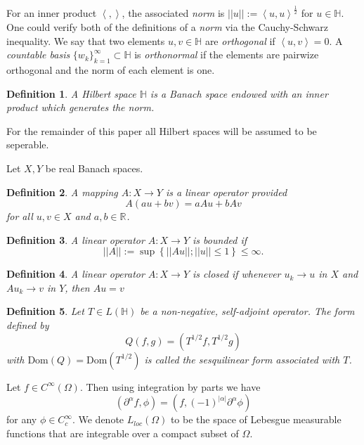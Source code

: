\documentclass[12pt]{report}
\newtheorem{definition}{Definition}
\numberwithin{definition}{section}
\begin{document}
For an inner product $ \left< , \right>$, the associated \textit{norm} is $|| u || := \left< u,u \right>^{\frac{1}{2}}$ for $u \in \mathbb{H}$.
One could verify both of the definitions of a \textit{norm} via the Cauchy-Schwarz inequality.
We say that two elements $u,v \in \mathbb{H}$ are \textit{orthogonal} if $\left< u,v \right> = 0$.
A \textit{countable basis} $\{w_{k}\}_{k=1}^\infty \subset \mathbb{H}$ is \textit{orthonormal} if the elements are pairwize orthogonal and the norm of each element is one.


\begin{definition}
  A Hilbert space $\mathbb{H}$ is a Banach space endowed with an inner product which generates the norm.
\end{definition}
For the remainder of this paper all Hilbert spaces will be assumed to be seperable.

Let $X,Y$ be real Banach spaces.
\begin{definition}
  A mapping $ A : X \to Y $ is a linear operator provided
  \[
  A(au + bv) = aAu + bAv
  \] 
  for all $u,v \in X$ and $a,b \in \mathbb{R}^{} $.
\end{definition}

\begin{definition}
  A linear operator $ A : X \to Y $ is bounded if 
  \[
  || A || := \sup \left\{ || Au ||; || u || \leq 1  \right\} \leq \infty
  .\] 
\end{definition}

\begin{definition}
  A linear operator $ A : X \to Y $ is closed if whenever $u_{k} \to u$ in $X$ and $Au_{k} \to v$ in $Y$, then $Au = v$
\end{definition}


\begin{definition}
  Let $T \in L(\mathbb{H})$ be a non-negative, self-adjoint operator. The form defined by
  \[
  Q(f,g) = \left( T^{1 / 2}f,T^{1 / 2}g \right)
  \] 
  with $\text{Dom}(Q) = \text{Dom}(T^{1 / 2})$ is called the sesquilinear form associated with $T$.
\end{definition}



Let $f \in C^{\infty}(\Omega)$.
Then using integration by parts we have 
\[
\left( \partial^{\alpha}f, \phi \right) = \left( f, (-1)^{| \alpha |} \partial^{\alpha} \phi \right)
\] 
for any $\phi \in C_{c}^{\infty}$.
We denote $L_{loc}(\Omega)$ to be the space of Lebesgue measurable functions that are integrable over a compact subset of $\Omega$.
\end{document}
